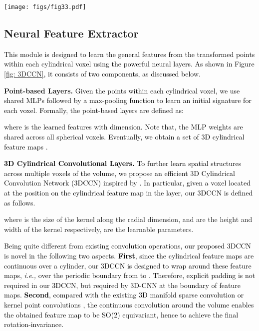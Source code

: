 \documentclass[final]{cvpr}
\newcommand{\qy}[1]{\textcolor{black}{#1}}
\newcommand{\bo}[1]{\textcolor{black}{#1}}
\begin{document}
\begin{figure*}[thb]
	\begin{center}
		\texttt{[image: figs/fig33.pdf]}
	\end{center}
	\caption{\qy{Illustration of the proposed Neural Feature Extractor.}}
	\label{fig: 3DCCN}
\end{figure*}
\vspace{-0.2cm}

 
\subsection{Neural Feature Extractor}
\label{subsec: CCN}
\bo{This module is designed to learn the general features from the transformed points within each cylindrical voxel using the powerful neural layers. As shown in Figure \ref{fig: 3DCCN}, it consists of two components, as discussed below.}

{\bf Point-based Layers.} \qy{ Given the points within each cylindrical voxel, we use shared MLPs followed by a max-pooling function  to learn an initial signature for each voxel. Formally, the point-based layers are defined as:}

\qy{where  is the learned features with  dimension. Note that, the MLP weights are shared across all spherical voxels. Eventually, we obtain a set of 3D cylindrical feature maps . 
}


\bo{\bf 3D Cylindrical Convolutional Layers.}
\qy{To further learn spatial structures across multiple voxels of the volume, we propose an efficient 3D Cylindrical Convolution Network (3DCCN) inspired by \cite{joung2020cylindrical}. In particular, given a voxel located at the position  on the  cylindrical feature map in the  layer, our 3DCCN is defined as follows. }

where  is the size of the kernel along the radial dimension,  and  are the height and width of the kernel respectively,  are the learnable parameters. 

\bo{Being quite different from existing convolution operations, our proposed 3DCCN is novel in the following two aspects. \textbf{First}, since the cylindrical feature maps are  continuous over a cylinder, our 3DCCN is designed to wrap around these feature maps, \textit{i.e.,} over the periodic boundary from  to . Therefore, explicit padding is not required in our 3DCCN, but required by 3D-CNN at the boundary of feature maps. \textbf{Second}, compared with the existing 3D manifold sparse convolution \cite{choy2019fully} or kernel point convolutions \cite{bai2020d3feat}, the continuous convolution around the  volume enables the obtained feature map to be SO(2) equivariant, hence to achieve the  final rotation-invariance.
}
\end{document}
